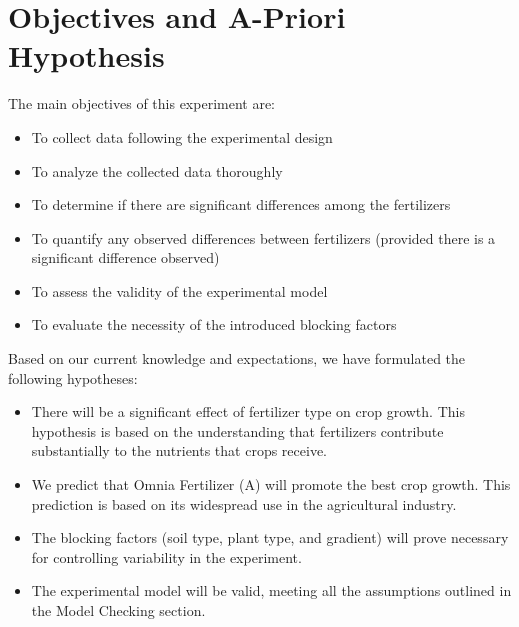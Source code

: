 \documentclass{article}
\begin{document}
\section{Objectives and A-Priori Hypothesis}
The main objectives of this experiment are:
\begin{itemize}
    \item To collect data following the experimental design
    \item To analyze the collected data thoroughly
    \item To determine if there are significant differences among the fertilizers
    \item To quantify any observed differences between fertilizers (provided there is a significant difference observed)
    \item To assess the validity of the experimental model
    \item To evaluate the necessity of the introduced blocking factors
\end{itemize}

Based on our current knowledge and expectations, we have formulated the following hypotheses:

\begin{itemize}
    \item There will be a significant effect of fertilizer type on crop growth. This hypothesis is based on the understanding that fertilizers contribute substantially to the nutrients that crops receive.
    \item We predict that Omnia Fertilizer (A) will promote the best crop growth. This prediction is based on its widespread use in the agricultural industry.
    \item The blocking factors (soil type, plant type, and gradient) will prove necessary for controlling variability in the experiment.
    \item The experimental model will be valid, meeting all the assumptions outlined in the Model Checking section.
\end{itemize}
\end{document}
